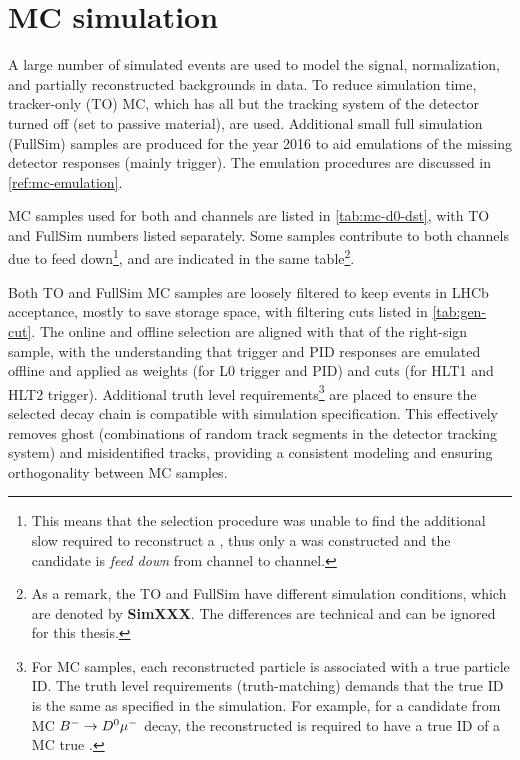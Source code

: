 \section{MC simulation}
\label{ref:sel:mc}

A large number of simulated events are used to model the signal, normalization,
and partially reconstructed backgrounds in data.
To reduce simulation time, tracker-only (TO) MC, which has all but the tracking
system of the detector turned off (set to passive material), are used.
Additional small full simulation (FullSim) samples are produced for the year
2016 to aid emulations of the missing detector responses (mainly trigger).
The emulation procedures are discussed in \cref{ref:mc-emulation}.

MC samples used for both \Dz and \Dstar channels are listed in
\cref{tab:mc-d0-dst}, with TO and FullSim numbers listed separately.
Some samples contribute to both channels due to feed down\footnote{
    This means that the selection procedure was unable to find the
    additional slow \pion required to reconstruct a \Dstar, thus only a
    \Dz was constructed and the candidate is \emph{feed down} from \Dstar
    channel to \Dz channel.
}, and are indicated in the same table\footnote{
    As a remark, the TO and FullSim have different simulation conditions,
    which are denoted by \textbf{SimXXX}.
    The differences are technical and can be ignored for this thesis.
}.





Both TO and FullSim MC samples are loosely filtered to keep events in LHCb
acceptance, mostly to save storage space,
with filtering cuts listed in \cref{tab:gen-cut}.
The online and offline selection are aligned with that of the right-sign sample,
with the understanding that trigger and PID responses are emulated offline and
applied as weights (for L0 trigger and PID) and cuts
(for HLT1 and HLT2 trigger).
Additional truth level requirements\footnote{
    For MC samples, each reconstructed particle is associated with a true
    particle ID. The truth level requirements (truth-matching) demands that
    the true ID is the same as specified in the simulation.
    For example, for a candidate from  MC ${{{B}^-}} \rightarrow {\ensuremath{{D}^0}}{\ensuremath{\mu^-}}$ decay,
    the reconstructed \muon is required to have a true ID of a MC true \muon.
} are placed to ensure the selected decay
chain is compatible with simulation specification.
This effectively removes ghost
(combinations of random track segments in the detector tracking system)
and misidentified tracks,
providing a consistent modeling and ensuring orthogonality between MC samples.

